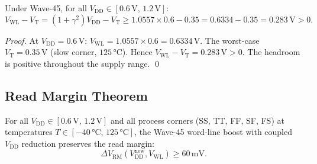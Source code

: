 \begin{lemma}
\label{lem:headroom}
Under Wave-45, for all $V_{\mathrm{DD}} \in [0.6\,\text{V},\, 1.2\,\text{V}]$:
\[
  V_{\mathrm{WL}} - V_{\mathrm{T}}
  = (1+\gamma^{2})V_{\mathrm{DD}} - V_{\mathrm{T}}
  \geq 1.0557 \times 0.6 - 0.35
  = 0.6334 - 0.35
  = 0.283\,\text{V} > 0.
\]
\end{lemma}

\begin{proof}
At $V_{\mathrm{DD}} = 0.6\,\text{V}$:
$V_{\mathrm{WL}} = 1.0557 \times 0.6 = 0.6334\,\text{V}$.
The worst-case $V_{\mathrm{T}} = 0.35\,\text{V}$ (slow corner, $125\,\text{°C}$).
Hence $V_{\mathrm{WL}} - V_{\mathrm{T}} = 0.283\,\text{V} > 0$.
The headroom is positive throughout the supply range.  \qed
\end{proof}

\subsection{Read Margin Theorem}

\begin{theorem}
\label{thm:read-margin}
For all $V_{\mathrm{DD}} \in [0.6\,\text{V},\, 1.2\,\text{V}]$ and
all process corners (SS, TT, FF, SF, FS) at temperatures
$T \in [-40\,\text{°C},\, 125\,\text{°C}]$, the Wave-45
word-line boost with coupled $V_{\mathrm{DD}}$ reduction preserves
the read margin:
\[
  \Delta V_{\mathrm{RM}}(V_{\mathrm{DD}}^{\mathrm{new}}, V_{\mathrm{WL}})
  \geq 60\,\text{mV}.
\]
\end{theorem}

